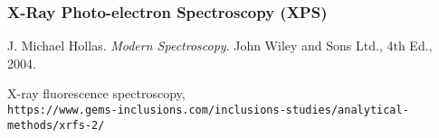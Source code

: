 \documentclass[]{article}
\begin{document}
\subsubsection{X-Ray Photo-electron Spectroscopy (XPS)} %

\newpage

\begin{thebibliography}{9}
J. Michael Hollas. 
\textit{Modern Spectroscopy}. 
John Wiley and Sons Ltd., 4th Ed., 2004.

X-ray fluorescence spectroscopy,
\\\texttt{https://www.gems-inclusions.com/inclusions-studies/analytical-methods/xrfs-2/}
\end{thebibliography}
\end{document}
